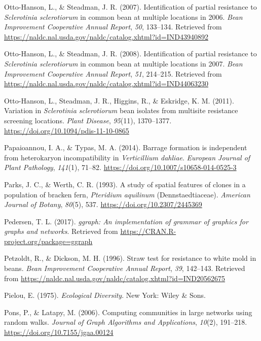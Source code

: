 \documentclass[fleqn,10pt,lineno]{wlpeerj} %
\theoremstyle{definition}
\theoremstyle{definition}
\theoremstyle{definition}
\theoremstyle{remark}
\begin{document}
\hypertarget{ref-otto2007identification}{}
Otto-Hanson, L., \& Steadman, J. R. (2007). Identification of partial
resistance to \emph{Sclerotinia sclerotiorum} in common bean at multiple
locations in 2006. \emph{Bean Improvement Cooperative Annual Report},
\emph{50}, 133--134. Retrieved from
\url{https://naldc.nal.usda.gov/naldc/catalog.xhtml?id=IND43940892}

\hypertarget{ref-otto2008identification}{}
Otto-Hanson, L., \& Steadman, J. R. (2008). Identification of partial
resistance to \emph{Sclerotinia sclerotiorum} in common bean at multiple
locations in 2007. \emph{Bean Improvement Cooperative Annual Report},
\emph{51}, 214--215. Retrieved from
\url{https://naldc.nal.usda.gov/naldc/catalog.xhtml?id=IND44063230}

\hypertarget{ref-otto-hanson2011variation}{}
Otto-Hanson, L., Steadman, J. R., Higgins, R., \& Eskridge, K. M.
(2011). Variation in \emph{Sclerotinia sclerotiorum} bean isolates from
multisite resistance screening locations. \emph{Plant Disease},
\emph{95}(11), 1370--1377. \url{https://doi.org/10.1094/pdis-11-10-0865}

\hypertarget{ref-papaioannou2014barrage}{}
Papaioannou, I. A., \& Typas, M. A. (2014). Barrage formation is
independent from heterokaryon incompatibility in \emph{Verticillium
dahliae}. \emph{European Journal of Plant Pathology}, \emph{141}(1),
71--82. \url{https://doi.org/10.1007/s10658-014-0525-3}

\hypertarget{ref-parks1993study}{}
Parks, J. C., \& Werth, C. R. (1993). A study of spatial features of
clones in a population of bracken fern, \emph{Pteridium aquilinum}
(Dennstaedtiaceae). \emph{American Journal of Botany}, \emph{80}(5),
537. \url{https://doi.org/10.2307/2445369}

\hypertarget{ref-ggraph}{}
Pedersen, T. L. (2017). \emph{ggraph: An implementation of grammar of
graphics for graphs and networks}. Retrieved from
\url{https://CRAN.R-project.org/package=ggraph}

\hypertarget{ref-petzoldt1996straw}{}
Petzoldt, R., \& Dickson, M. H. (1996). Straw test for resistance to
white mold in beans. \emph{Bean Improvement Cooperative Annual Report},
\emph{39}, 142--143. Retrieved from
\url{https://naldc.nal.usda.gov/naldc/catalog.xhtml?id=IND20562675}

\hypertarget{ref-pielou1975ecological}{}
Pielou, E. (1975). \emph{Ecological Diversity}. New York: Wiley \& Sons.

\hypertarget{ref-pons2006computing}{}
Pons, P., \& Latapy, M. (2006). Computing communities in large networks
using random walks. \emph{Journal of Graph Algorithms and Applications},
\emph{10}(2), 191--218. \url{https://doi.org/10.7155/jgaa.00124}
\end{document}
